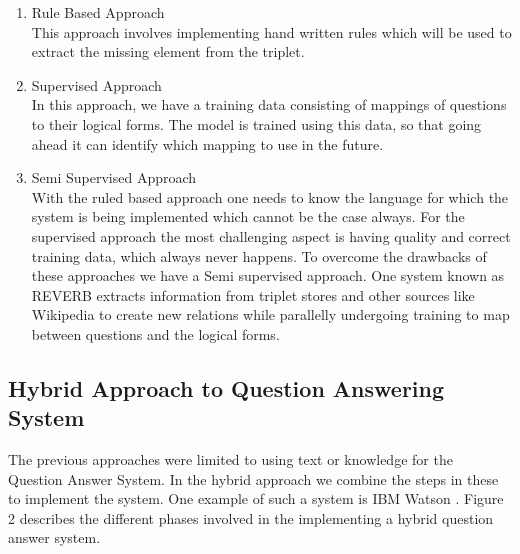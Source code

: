 \begin{enumerate}

\item Rule Based Approach \\
This approach involves implementing hand written rules which will be used to extract the missing element from the triplet.
 
 \item Supervised Approach \\
In this approach, we have a training data consisting of mappings of questions to their logical forms. The model is trained using this data, so that going ahead it can identify which mapping to use in the future.
 
 \item Semi Supervised Approach \\
With the ruled based approach one needs to know the language for which the system is being implemented which cannot be the case always. For the supervised approach the most challenging aspect is having quality and correct training data, which always never happens. To overcome the drawbacks of these approaches we have a Semi supervised approach. One system known as REVERB extracts information from triplet stores and other sources like Wikipedia to create new relations while parallelly undergoing training to map between questions and the logical forms.

\end{enumerate}

\subsection{Hybrid Approach to Question Answering System}
The previous approaches were limited to using text or knowledge for the Question Answer System. In the hybrid approach we combine the steps in these to implement the system. One example of such a system is IBM Watson \cite {high2012era}. Figure 2 describes the different phases involved in the implementing a hybrid question answer system.

